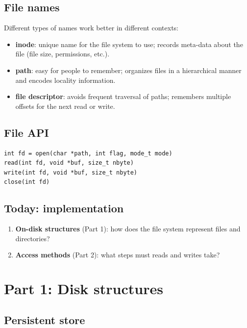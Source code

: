 \documentclass[11pt,a4paper]{article}
\begin{document}
\subsection{File names}

Different types of names work better in different contexts:

\begin{itemize}
  \item \textbf{inode}: unique name for the file system to use; records
        meta-data about the file (file size, permissions, etc.).
  \item \textbf{path}: easy for people to remember; organizes files in a
        hierarchical manner and encodes locality information.
  \item \textbf{file descriptor}: avoids frequent traversal of paths;
        remembers multiple offsets for the next read or write.
\end{itemize}

\subsection{File API}

\begin{lstlisting}[numbers=none]
int fd = open(char *path, int flag, mode_t mode)
read(int fd, void *buf, size_t nbyte)
write(int fd, void *buf, size_t nbyte)
close(int fd)
\end{lstlisting}

\subsection{Today: implementation}

\begin{enumerate}
  \item \textbf{On-disk structures} (Part 1): how does the file system
        represent files and directories?
  \item \textbf{Access methods} (Part 2): what steps must reads and writes
        take?
\end{enumerate}

\section{Part 1: Disk structures}

\subsection{Persistent store}
\end{document}

